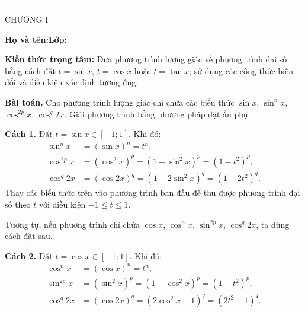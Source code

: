 \documentclass[11pt,a4paper]{article}
\newcommand{\sectitle}[2]{\vspace{4pt}\noindent{\large\bfseries\textcolor{questionpurple}{#1.\ #2}}\par\vspace{3pt}}
\begin{document}
\noindent
\begin{minipage}[t]{.35\linewidth}
 \vspace{2pt}\rule{.73\linewidth}{.4pt}\par\vspace{3pt}
 CHƯƠNG I\par\vspace{3pt}{\itshape TÀI LIỆU HỌC TẬP -- BÀI 06\par}
\end{minipage}\hfill
\begin{minipage}[t]{.62\linewidth}
 \vspace{4pt}{\small\bfseries BÀI 06. PHƯƠNG PHÁP ĐẶT ẨN PHỤ\par TRONG PHƯƠNG TRÌNH LƯỢNG GIÁC\par}
\end{minipage}

\vspace{5mm}
\noindent\textbf{Họ và tên:}\dotfill\hfill\textbf{Lớp:}\enspace\dotfill
\vspace{3mm}
\begin{theorybox}
\textbf{Kiến thức trọng tâm:} Đưa phương trình lượng giác về phương trình đại số
bằng cách đặt $t=\sin x$, $t=\cos x$ hoặc $t=\tan x$; sử dụng các
công thức biến đổi và điều kiện xác định tương ứng.
\end{theorybox}

\sectitle{1}{Phương pháp đặt ẩn phụ $\sin x$ và $\cos x$}
\textbf{Bài toán.} Cho phương trình lượng giác chỉ chứa các biểu thức
$\sin x$, $\sin^n x$, $\cos^{2p}x$, $\cos^q 2x$.
Giải phương trình bằng phương pháp đặt ẩn phụ.

\begin{theorybox}
\textbf{Cách 1.} Đặt $t=\sin x\in[-1;1]$. Khi đó:
\[
\begin{aligned}
\sin^n x&=(\sin x)^n=t^n,\\
\cos^{2p}x&=(\cos^2x)^p=(1-\sin^2x)^p=(1-t^2)^p,\\
\cos^q 2x&=(\cos 2x)^q=(1-2\sin^2x)^q=(1-2t^2)^q.
\end{aligned}
\]
Thay các biểu thức trên vào phương trình ban đầu để thu được phương trình
đại số theo $t$ với điều kiện $-1\le t\le1$.
\end{theorybox}

Tương tự, nếu phương trình chỉ chứa $\cos x$, $\cos^n x$,
$\sin^{2p}x$, $\cos^q 2x$, ta dùng cách đặt sau.
\begin{theorybox}
\textbf{Cách 2.} Đặt $t=\cos x\in[-1;1]$. Khi đó:
\[
\begin{aligned}
\cos^n x&=(\cos x)^n=t^n,\\
\sin^{2p}x&=(\sin^2x)^p=(1-\cos^2x)^p=(1-t^2)^p,\\
\cos^q 2x&=(\cos 2x)^q=(2\cos^2x-1)^q=(2t^2-1)^q.
\end{aligned}
\]
\end{theorybox}
\end{document}
